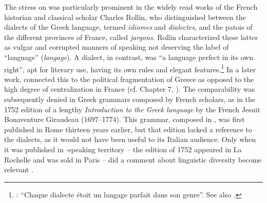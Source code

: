 The stress on  was particularly prominent in the widely read works of the French historian and classical scholar Charles Rollin, who distinguished between the dialects of the Greek language, termed \textit{idiomes} and \textit{dialectes}, and the patois of the different provinces of France, called \textit{jargons}. Rollin characterized these latter as vulgar and corrupted manners of speaking not deserving the label of “language” (\textit{langage}). A dialect, in contrast, was “a language perfect in its own right”, apt for literary use, having its own rules and elegant features.\footnote{\citet[117]{Rollin1726}: “Chaque dialecte étoit un langage parfait dans son genre”. See also \citet[395]{Rollin1731}.} In a later work, \citet[395]{Rollin1731} connected this to the political fragmentation of Greece as opposed to the high degree of centralization in France (cf. Chapter 7, ). The comparability was subsequently denied in Greek grammars composed by French scholars, as in the 1752 edition of a lengthy \textit{Introduction to the Greek language} by the French Jesuit Bonaventure Giraudeau (1697–1774). This grammar, composed in , was first published in Rome thirteen years earlier, but that edition lacked a reference to the  dialects, as it would not have been useful to its Italian audience. Only when it was published in -speaking territory – the edition of 1752 appeared in La Rochelle and was sold in Paris – did a comment about  linguistic diversity become relevant \citep[117]{Giraudeau1752}.

